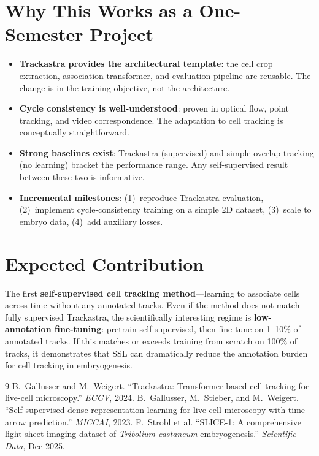 \documentclass{article}
\begin{document}
\section*{Why This Works as a One-Semester Project}

\begin{itemize}
	\item \textbf{Trackastra provides the architectural template}: the cell crop extraction, association transformer, and evaluation pipeline are reusable. The change is in the training objective, not the architecture.
	\item \textbf{Cycle consistency is well-understood}: proven in optical flow, point tracking, and video correspondence. The adaptation to cell tracking is conceptually straightforward.
	\item \textbf{Strong baselines exist}: Trackastra (supervised) and simple overlap tracking (no learning) bracket the performance range. Any self-supervised result between these two is informative.
	\item \textbf{Incremental milestones}: (1)~reproduce Trackastra evaluation, (2)~implement cycle-consistency training on a simple 2D dataset, (3)~scale to embryo data, (4)~add auxiliary losses.
\end{itemize}

\section*{Expected Contribution}

The first \textbf{self-supervised cell tracking method}---learning to associate cells across time without any annotated tracks. Even if the method does not match fully supervised Trackastra, the scientifically interesting regime is \textbf{low-annotation fine-tuning}: pretrain self-supervised, then fine-tune on 1--10\% of annotated tracks. If this matches or exceeds training from scratch on 100\% of tracks, it demonstrates that SSL can dramatically reduce the annotation burden for cell tracking in embryogenesis.

\begin{thebibliography}{9}
	 B.~Gallusser and M.~Weigert. ``Trackastra: Transformer-based cell tracking for live-cell microscopy.'' \textit{ECCV}, 2024.
	 B.~Gallusser, M.~Stieber, and M.~Weigert. ``Self-supervised dense representation learning for live-cell microscopy with time arrow prediction.'' \textit{MICCAI}, 2023.
	 F.~Strobl et al. ``SLICE-1: A comprehensive light-sheet imaging dataset of \textit{Tribolium castaneum} embryogenesis.'' \textit{Scientific Data}, Dec 2025.
\end{thebibliography}
\end{document}
